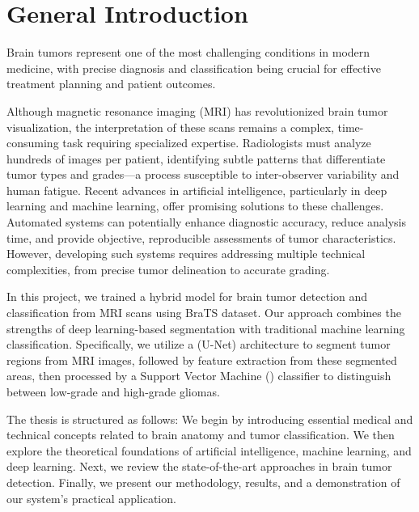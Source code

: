 \chapter*{General Introduction}

Brain tumors represent one of the most challenging conditions in modern medicine, with precise diagnosis and classification being crucial for effective treatment planning and patient outcomes.

Although magnetic resonance imaging (MRI) has revolutionized brain tumor visualization, the interpretation of these scans remains a complex, time-consuming task requiring specialized expertise. Radiologists must analyze hundreds of images per patient, identifying subtle patterns that differentiate tumor types and grades—a process susceptible to inter-observer variability and human fatigue. Recent advances in artificial intelligence, particularly in deep learning and machine learning, offer promising solutions to these challenges. Automated systems can potentially enhance diagnostic accuracy, reduce analysis time, and provide objective, reproducible assessments of tumor characteristics. However, developing such systems requires addressing multiple technical complexities, from precise tumor delineation to accurate grading.

In this project, we trained a hybrid model for brain tumor detection and classification from MRI scans using BraTS dataset. Our approach combines the strengths of deep learning-based segmentation with traditional machine learning classification. Specifically, we utilize a (U-Net) architecture to segment tumor regions from MRI images, followed by feature extraction from these segmented areas, then processed by a Support Vector Machine () classifier to distinguish between low-grade and high-grade gliomas.

The thesis is structured as follows: We begin by introducing essential medical and technical concepts related to brain anatomy and tumor classification. We then explore the theoretical foundations of artificial intelligence, machine learning, and deep learning. Next, we review the state-of-the-art approaches in brain tumor detection. Finally, we present our methodology, results, and a demonstration of our system's practical application.
